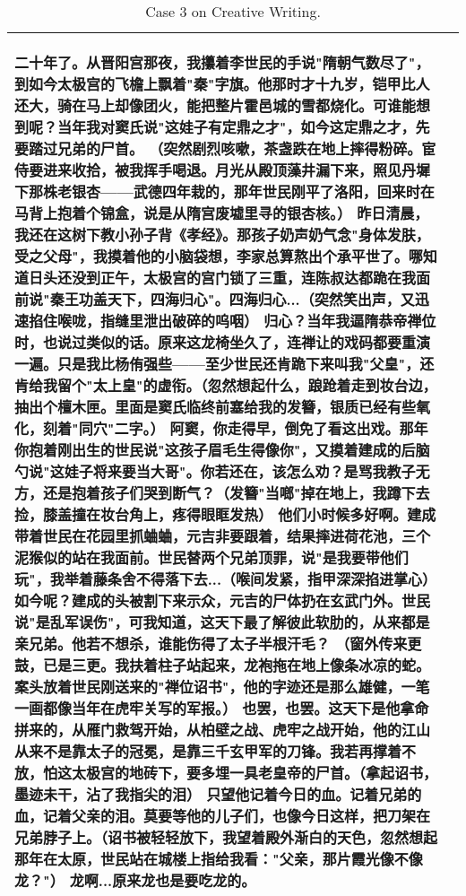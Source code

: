 \begin{table}
\begin{tabular}{>{\centering\arraybackslash}p{1.2cm}|p{14.5cm}}
\begin{CJK*}{UTF8}{gbsn}
二十年了。从晋阳宫那夜，我攥着李世民的手说"隋朝气数尽了"，到如今太极宫的飞檐上飘着"秦"字旗。他那时才十九岁，铠甲比人还大，骑在马上却像团火，能把整片霍邑城的雪都烧化。可谁能想到呢？当年我对窦氏说"这娃子有定鼎之才"，如今这定鼎之才，先要踏过兄弟的尸首。
（突然剧烈咳嗽，茶盏跌在地上摔得粉碎。宦侍要进来收拾，被我挥手喝退。月光从殿顶藻井漏下来，照见丹墀下那株老银杏——武德四年栽的，那年世民刚平了洛阳，回来时在马背上抱着个锦盒，说是从隋宫废墟里寻的银杏核。）
昨日清晨，我还在这树下教小孙子背《孝经》。那孩子奶声奶气念"身体发肤，受之父母"，我摸着他的小脑袋想，李家总算熬出个承平世了。哪知道日头还没到正午，太极宫的宫门锁了三重，连陈叔达都跪在我面前说"秦王功盖天下，四海归心"。四海归心...（突然笑出声，又迅速掐住喉咙，指缝里泄出破碎的呜咽）
归心？当年我逼隋恭帝禅位时，也说过类似的话。原来这龙椅坐久了，连禅让的戏码都要重演一遍。只是我比杨侑强些——至少世民还肯跪下来叫我"父皇"，还肯给我留个"太上皇"的虚衔。（忽然想起什么，踉跄着走到妆台边，抽出个檀木匣。里面是窦氏临终前塞给我的发簪，银质已经有些氧化，刻着"同穴"二字。）
阿窦，你走得早，倒免了看这出戏。那年你抱着刚出生的世民说"这孩子眉毛生得像你"，又摸着建成的后脑勺说"这娃子将来要当大哥"。你若还在，该怎么劝？是骂我教子无方，还是抱着孩子们哭到断气？（发簪"当啷"掉在地上，我蹲下去捡，膝盖撞在妆台角上，疼得眼眶发热）
他们小时候多好啊。建成带着世民在花园里抓蛐蛐，元吉非要跟着，结果摔进荷花池，三个泥猴似的站在我面前。世民替两个兄弟顶罪，说"是我要带他们玩"，我举着藤条舍不得落下去...（喉间发紧，指甲深深掐进掌心）
如今呢？建成的头被割下来示众，元吉的尸体扔在玄武门外。世民说"是乱军误伤"，可我知道，这天下最了解彼此软肋的，从来都是亲兄弟。他若不想杀，谁能伤得了太子半根汗毛？
（窗外传来更鼓，已是三更。我扶着柱子站起来，龙袍拖在地上像条冰凉的蛇。案头放着世民刚送来的"禅位诏书"，他的字迹还是那么雄健，一笔一画都像当年在虎牢关写的军报。）
也罢，也罢。这天下是他拿命拼来的，从雁门救驾开始，从柏壁之战、虎牢之战开始，他的江山从来不是靠太子的冠冕，是靠三千玄甲军的刀锋。我若再撑着不放，怕这太极宫的地砖下，要多埋一具老皇帝的尸首。（拿起诏书，墨迹未干，沾了我指尖的泪）
只望他记着今日的血。记着兄弟的血，记着父亲的泪。莫要等他的儿子们，也像今日这样，把刀架在兄弟脖子上。（诏书被轻轻放下，我望着殿外渐白的天色，忽然想起那年在太原，世民站在城楼上指给我看："父亲，那片霞光像不像龙？"）
龙啊...原来龙也是要吃龙的。
\end{CJK*} \\
\bottomrule
\end{tabular}
\caption{Case 3 on Creative Writing.}
\label{tbl:creative_writing_case3}
\end{table}

